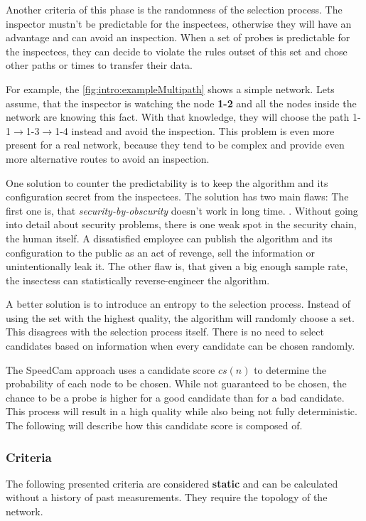 \documentclass[thesis.tex]{subfiles}
\begin{document}
Another criteria of this phase is the randomness of the selection process. The inspector mustn't be predictable for the inspectees, otherwise they will have an advantage and can avoid an inspection. When a set of probes is predictable for the inspectees, they can decide to violate the rules outset of this set and chose other paths or times to transfer their data. 

For example, the \autoref{fig:intro:exampleMultipath} shows a simple network. Lets assume, that the inspector is watching the node \textbf{1-2} and all the nodes inside the network are knowing this fact. With that knowledge, they will choose the path 1-1$\rightarrow$1-3$\rightarrow$1-4 instead and avoid the inspection. This problem is even more present for a real network, because they tend to be complex and provide even more alternative routes to avoid an inspection.

One solution to counter the predictability is to keep the algorithm and its configuration secret from the inspectees. The solution has two main flaws: The first one is, that \textit{security-by-obscurity} doesn't work in long time. . Without going into detail about security problems, there is one weak spot in the security chain, the human itself. A dissatisfied employee can publish the algorithm and its configuration to the public as an act of revenge, sell the information or unintentionally leak it. The other flaw is, that given a big enough sample rate, the insectess can statistically reverse-engineer the algorithm. 

A better solution is to introduce an entropy to the selection process. Instead of using the set with the highest quality, the algorithm will randomly choose a set. This disagrees with the selection process itself. There is no need to select candidates based on information when every candidate can be chosen randomly.

The SpeedCam approach uses a candidate score $cs(n)$ to determine the probability of each node to be chosen. While not guaranteed to be chosen, the chance to be a probe is higher for a good candidate than for a bad candidate. This process will result in a high quality while also being not fully deterministic. The following will describe how this candidate score is composed of.

\subsubsection{Criteria} \label{sec:main:selectionPhase:criteria}
The following presented criteria are considered \textbf{static} and can be calculated without a history of past measurements. They require the topology of the network.
\end{document}
